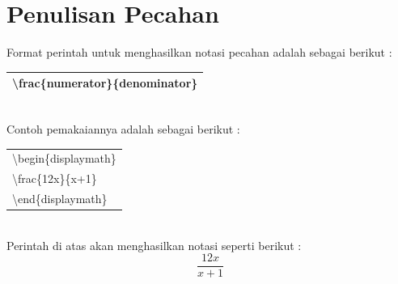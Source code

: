 \section{Penulisan Pecahan}
Format perintah untuk menghasilkan notasi pecahan adalah sebagai berikut :\\[0.5 cm]
\begin{tabular}{|p{13.5 cm}|}
\hline
\textbackslash frac\{numerator\}\{denominator\}\\
\hline
\end{tabular}\\[0.5 cm]
Contoh pemakaiannya adalah sebagai berikut :\\[0.5 cm]
\begin{tabular}{|p{13.5 cm}|}
\hline
\textbackslash begin\{displaymath\}\\
   \textbackslash frac\{12x\}\{x+1\}\\
\textbackslash end\{displaymath\}\\
\hline
\end{tabular}\\[0.5 cm]
Perintah di atas akan menghasilkan notasi seperti berikut :\\[0.5 cm]
\begin{displaymath}
\frac{12x}{x+1}
\end{displaymath}
